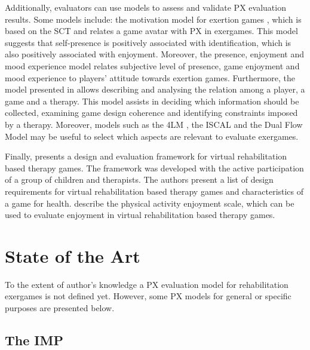Additionally, evaluators can use models to assess and validate PX evaluation results. Some models include: the motivation model for exertion games \autocite{Li2016}, which is based on the \ac{SCT} and relates a game avatar with \ac{PX} in exergames. This model suggests that self-presence is positively associated with identification, which is also positively associated with enjoyment. Moreover, the presence, enjoyment and mood experience model \autocite{Ho2017} relates subjective level of presence, game enjoyment and mood experience to players' attitude towards exertion games. Furthermore, the model presented in \autocite{Mader2012} allows describing and analysing the relation among a player, a game and a therapy. This model assists in deciding which information should be collected, examining game design coherence and identifying constraints imposed by a therapy. Moreover, models such as the \ac{4LM} \autocite{Mueller2011}, the \ac{ISCAL} \autocite{Zhang2011} and the Dual Flow Model \autocite{Sinclair2007} may be useful to select which aspects are relevant to evaluate exergames.

Finally, \textcite{Ni2014} presents a design and evaluation framework for virtual rehabilitation based therapy games. The framework was developed with the active participation of a group of children and therapists. The authors present a list of design requirements for virtual rehabilitation based therapy games and characteristics of a game for health. \textcite{kendzierski1991physical} describe the physical activity enjoyment scale, which can be used to evaluate enjoyment in virtual rehabilitation based therapy games.


\section{State of the Art}
\label{sec:ox_ux_models}

To the extent of author's knowledge a \ac{PX} evaluation model for rehabilitation exergames is not defined yet. However, some \ac{PX} models for general or specific purposes are presented below.

\subsection{The \ac{IMP}} 

